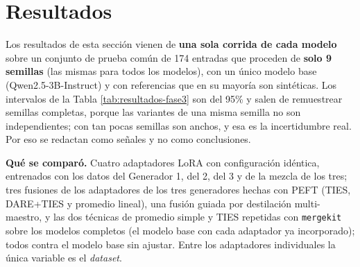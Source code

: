 \documentclass[11pt,a4paper]{article}
\begin{document}
\section{Resultados}
\label{sec:resultados}

Los resultados de esta sección vienen de \textbf{una sola corrida de cada modelo} sobre un conjunto de prueba común de 174 entradas que proceden de \textbf{solo 9 semillas} (las mismas para todos los modelos), con un único modelo base (Qwen2.5-3B-Instruct) y con referencias que en su mayoría son sintéticas. Los intervalos de la Tabla \ref{tab:resultados-fase3} son del 95\% y salen de remuestrear semillas completas, porque las variantes de una misma semilla no son independientes; con tan pocas semillas son anchos, y esa es la incertidumbre real. Por eso se redactan como señales y no como conclusiones.

\textbf{Qué se comparó.} Cuatro adaptadores LoRA con configuración idéntica, entrenados con los datos del Generador 1, del 2, del 3 y de la mezcla de los tres; tres fusiones de los adaptadores de los tres generadores hechas con PEFT (TIES, DARE+TIES y promedio lineal), una fusión guiada por destilación multi-maestro, y las dos técnicas de promedio simple y TIES repetidas con \texttt{mergekit} sobre los modelos completos (el modelo base con cada adaptador ya incorporado); todos contra el modelo base sin ajustar. Entre los adaptadores individuales la única variable es el \textit{dataset}.
\end{document}
